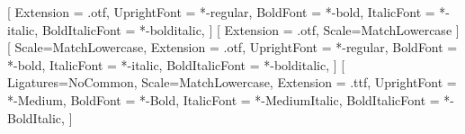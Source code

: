 \usepackage[english]{babel}

\usepackage{amsmath,amssymb,amsfonts}
\usepackage[utf8]{inputenc}

\usepackage{fontspec}
\usepackage{unicode-math}
\setmainfont{texgyretermes}[
	Extension = .otf,
	UprightFont = *-regular,
	BoldFont = *-bold,
	ItalicFont = *-italic,
	BoldItalicFont = *-bolditalic,
]
[
	Extension = .otf,
	Scale=MatchLowercase
]
\setsansfont{texgyreheros}[
	Scale=MatchLowercase,
	Extension = .otf,
	UprightFont = *-regular,
	BoldFont = *-bold,
	ItalicFont = *-italic,
	BoldItalicFont = *-bolditalic,
]
\setmonofont{JuliaMono}[
	Ligatures=NoCommon,
	Scale=MatchLowercase,
	Extension = .ttf,
	UprightFont = *-Medium,
	BoldFont = *-Bold,
	ItalicFont = *-MediumItalic,
	BoldItalicFont = *-BoldItalic,
]

\usepackage{lastpage}

\usepackage{gensymb}

\usepackage{setspace}

\usepackage{ccicons}

\usepackage[hang,flushmargin]{footmisc}

\usepackage{geometry}

\setlength{\parindent}{0pt}
\setlength{\parskip}{6pt plus 2pt minus 1pt}

\usepackage{fancyhdr}
\renewcommand{\headrulewidth}{0pt}